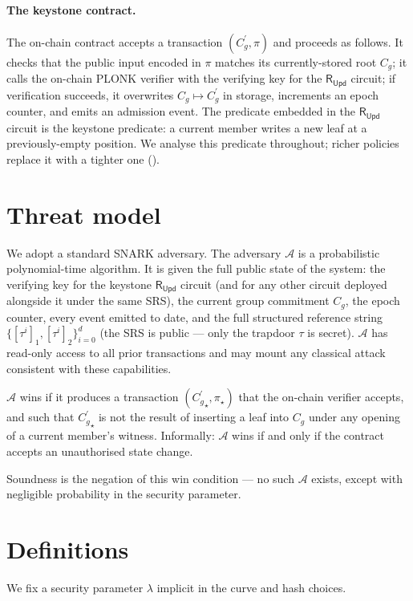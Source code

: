 \documentclass[11pt,a4paper]{article}
\theoremstyle{plain}
\theoremstyle{definition}
\newcommand{\Cg}{C_g}
\newcommand{\Cgp}{{C_g^{\prime}}}
\newcommand{\RUpd}{\mathsf{R}_{\mathsf{Upd}}}
\newcommand{\Adv}{\mathcal{A}}
\begin{document}
\paragraph{The keystone contract.}
The on-chain contract accepts a transaction $(\Cgp, \pi)$ and
proceeds as follows. It checks that the public input encoded in
$\pi$ matches its currently-stored root $\Cg$; it calls the
on-chain PLONK verifier with the verifying key for the $\RUpd$
circuit; if verification succeeds, it overwrites $\Cg \mapsto
\Cgp$ in storage, increments an epoch counter, and emits an
admission event. The predicate embedded in the $\RUpd$ circuit
is the keystone predicate: a current member writes a new leaf at
a previously-empty position. We analyse this predicate
throughout; richer policies replace it with a tighter one
().

\section{Threat model}
\label{sec:threat}

We adopt a standard SNARK adversary. The adversary $\Adv$ is a
probabilistic polynomial-time algorithm. It is given the full
public state of the system: the verifying key for the keystone
$\RUpd$ circuit (and for any other circuit deployed alongside it
under the same SRS), the current group commitment $\Cg$, the
epoch counter, every event emitted to date, and the full
structured reference string $\{[\tau^i]_1, [\tau^i]_2\}_{i=0}^{d}$
(the SRS is public --- only the trapdoor $\tau$ is secret).
$\Adv$ has read-only access to all prior transactions and may
mount any classical attack consistent with these capabilities.

$\Adv$ wins if it produces a transaction $(\Cgp_{\star}, \pi_{\star})$
that the on-chain verifier accepts, and such that
$\Cgp_{\star}$ is not the result of inserting a leaf into $\Cg$
under any opening of a current member's witness. Informally:
$\Adv$ wins if and only if the contract accepts an unauthorised
state change.

Soundness is the negation of this win condition --- no such
$\Adv$ exists, except with negligible probability in the
security parameter.

\section{Definitions}
\label{sec:defs}

We fix a security parameter $\lambda$ implicit in the curve and
hash choices.
\end{document}

